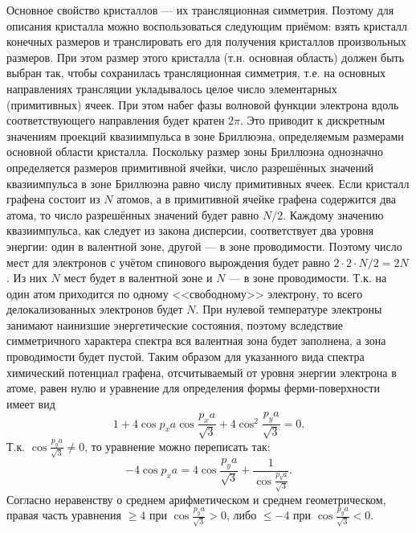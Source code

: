 \documentclass[a4paper]{article}
\begin{document}
\begin{sol}
Основное свойство кристаллов --- их трансляционная
симметрия. Поэтому для описания кристалла можно
воспользоваться следующим приёмом: взять кристалл
конечных размеров и транслировать его для
получения кристаллов произвольных размеров. При
этом размер этого кристалла (т.\:н. основная
область) должен быть выбран так, чтобы сохранилась
трансляционная симметрия, т.\:е. на основных
направлениях трансляции укладывалось целое
число элементарных (примитивных) ячеек. При
этом набег фазы волновой функции электрона вдоль
соответствующего направления будет кратен
$2\pi$. Это приводит к дискретным значениям проекций
квазиимпульса в зоне Бриллюэна, определяемым
размерами основной области кристалла. Поскольку
размер зоны Бриллюэна однозначно определяется
размеров примитивной ячейки, число разрешённых
значений квазиимпульса в зоне Бриллюэна равно
числу примитивных ячеек. Если кристалл графена
состоит из $N$ атомов, а в примитивной ячейке
графена содержится два атома, то число разрешённых
значений будет равно $N /2$. Каждому значению
квазиимпульса, как следует из закона дисперсии,
соответствует два уровня энергии: один в валентной
зоне, другой --- в зоне проводимости. Поэтому число
мест для электронов с учётом спинового вырождения
будет равно $2\cdot 2\cdot N /2 =2N$. Из них
$N$ мест будет в валентной зоне и $N$ --- в зоне
проводимости. Т.\:к. на один атом приходится по
одному <<свободному>> электрону, то всего делокализованных
электронов будет $N$. При нулевой температуре электроны
занимают наинизшие энергетические состояния, поэтому
вследствие симметричного характера спектра
вся валентная зона будет заполнена, а зона проводимости
будет пустой. Таким образом для указанного вида
спектра химический потенциал графена, отсчитываемый
от уровня энергии электрона в атоме, равен нулю
и уравнение для определения формы ферми-поверхности
имеет вид
\[
1+4 \cos p_x a \cos \frac{p_x a}{\sqrt{3} }+
4 \cos ^2 \frac{p_y a}{\sqrt{3} }=0
.\] 
Т.\:к. $\displaystyle \cos \frac{p_y a}{\sqrt{3} }
 \neq 0$, то уравнение можно переписать так:
\[
-4 \cos  p_x a = 4 \cos \frac{p_y a}{\sqrt{3} }+
\frac{1}{\cos \frac{p_y a}{\sqrt{3} } }
.\] 
Согласно неравенству о среднем арифметическом и
среднем геометрическом, правая часть уравнения
$\ge 4$ при $\displaystyle \cos \frac{p_y a}{\sqrt{3} }>0$, либо $\le -4$ при $\displaystyle \cos \frac{p_y
a}{\sqrt{3} }<0$.


\end{sol}
\end{document}
